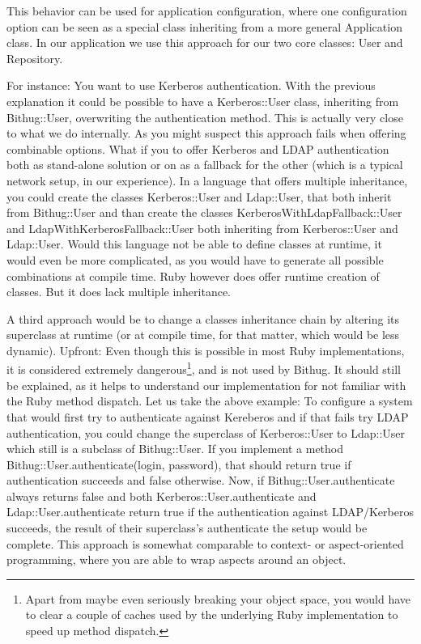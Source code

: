 \documentclass{llncs}
\begin{document}
This behavior can be used for application configuration, where one configuration option can be seen
as a special class inheriting from a more general Application class. In our application we use this
approach for our two core classes: User and Repository.

For instance: You want to use Kerberos authentication. With the previous explanation it could be possible
to have a Kerberos::User class, inheriting from Bithug::User, overwriting the authentication method.
This is actually very close to what we do internally. As you might suspect this approach fails when offering
combinable options. What if you to offer Kerberos and LDAP authentication both as stand-alone solution or
on as a fallback for the other (which is a typical network setup, in our experience). In a language that offers
multiple inheritance, you could create the classes Kerberos::User and Ldap::User, that both inherit from Bithug::User
and than create the classes KerberosWithLdapFallback::User and LdapWithKerberosFallback::User both inheriting
from Kerberos::User and Ldap::User. Would this language not be able to define classes at runtime, it would even be
more complicated, as you would have to generate all possible combinations at compile time. Ruby however does offer
runtime creation of classes. But it does lack multiple inheritance.

A third approach would be to change a classes inheritance chain by altering its superclass at runtime (or at compile
time, for that matter, which would be less dynamic). Upfront: Even though this is possible in most Ruby implementations,
it is considered extremely dangerous\footnote{Apart from maybe even seriously breaking your object space, you would have
to clear a couple of caches used by the underlying Ruby implementation to speed up method dispatch.}, and is not used
by Bithug. It should still be explained, as it helps to understand our implementation for not familiar with the Ruby
method dispatch. Let us take the above example: To configure a system that would first try to authenticate against Kereberos
and if that fails try LDAP authentication, you could change the superclass of Kerberos::User to Ldap::User which still
is a subclass of Bithug::User. If you implement a method Bithug::User.authenticate(login, password), that should return
true if authentication succeeds and false otherwise. Now, if Bithug::User.authenticate always returns false and both
Kerberos::User.authenticate and Ldap::User.authenticate return true if the authentication against LDAP/Kerberos succeeds,
the result of their superclass's authenticate the setup would be complete. This approach is somewhat comparable to context-
or aspect-oriented programming, where you are able to wrap aspects around an object\cite{apel2006aspectual}.
\end{document}
